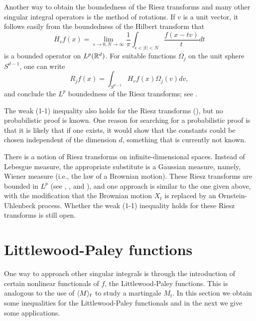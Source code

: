 
Another way to obtain the boundedness of the Riesz transforms and many other singular integral operators is the method of rotations. If $v$ is a unit vector, it follows easily from the boundedness of the Hilbert transform that
\[
    H_v f(x) = \lim_{\epsilon\to 0,N\to\infty} \frac{1}{\pi} \int_{\epsilon<|t|<N} \frac{f(x-tv)}{t}dt
\]
is a bounded operator on $L^p(\mathbb{R}^d)$. For suitable functions $\Omega_j$ on the unit sphere $S^{d-1}$, one can write
\[
    R_j f(x) = \int_{S^{d-1}} H_v f(x)\Omega_j(v)dv,
\]
and conclude the $L^p$ boundedness of the Riesz transforms; see \cite{SteinWeiss1971}.

The weak (1-1) inequality also holds for the Riesz transforms (\cite{Stein1970a}), but no probabilistic proof is known. One reason for searching for a probabilistic proof is that it is likely that if one exists, it would show that the constants could be chosen independent of the dimension $d$, something that is currently not known.

There is a notion of Riesz transforms on infinite-dimensional spaces. Instead of Lebesgue measure, the appropriate substitute is a Gaussian measure, namely, Wiener measure (i.e., the law of a Brownian motion). These Riesz transforms are bounded in $L^p$ (see \cite{Meyer1982,Meyer1984}, \cite{Pisier1988}, and \cite{Gundy1989}), and one approach is similar to the one given above, with the modification that the Brownian motion $X_t$ is replaced by an Ornstein-Uhlenbeck process. Whether the weak (1-1) inequality holds for these Riesz transforms is still open.

\section{Littlewood-Paley functions}\label{ch4_sec4}


One way to approach other singular integrals is through the introduction of certain nonlinear functionals of $f$, the Littlewood-Paley functions. This is analogous to the use of $\langle M \rangle_t$ to study a martingale $M_t$. In this section we obtain some inequalities for the Littlewood-Paley functionals and in the next we give some applications.

